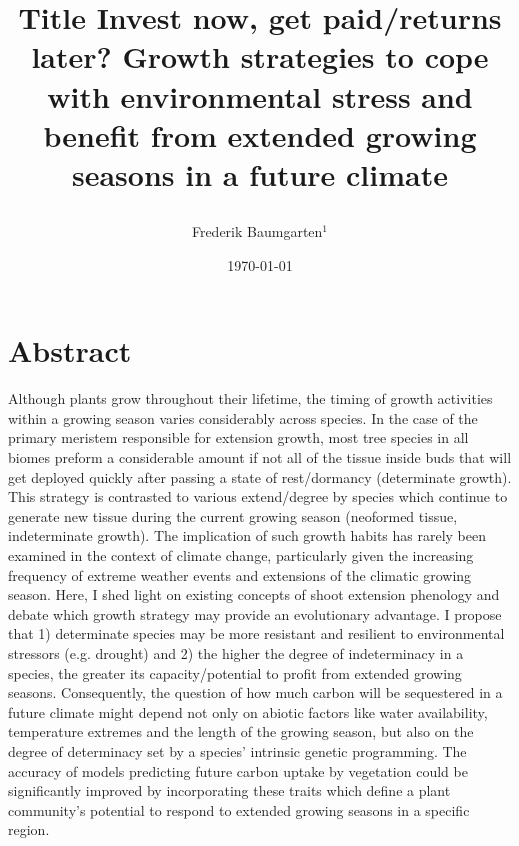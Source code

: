 \documentclass{article}
\begin{document}
\renewcommand{\bibname}{References}%



\title{Title
Invest now, get paid/returns later? Growth strategies to cope with environmental stress and benefit from extended growing seasons in a future climate %


} 


\date{\today}
\author{Frederik Baumgarten$^1$ }
\maketitle 

\section*{Abstract}

Although plants grow throughout their lifetime, the timing of growth activities within a growing season varies considerably across species. In the case of the primary meristem responsible for extension growth, most tree species in all biomes preform a considerable amount if not all of the tissue inside buds that will get deployed quickly after passing a state of rest/dormancy (determinate growth). This strategy is contrasted to various extend/degree by species which continue to generate new tissue during the current growing season (neoformed tissue, indeterminate growth). The implication of such growth habits has rarely been examined in the context of climate change, particularly given the increasing frequency of extreme weather events and extensions of the climatic growing season.  Here, I shed light on existing concepts of shoot extension phenology and debate which growth strategy may provide an evolutionary advantage. I propose that 1) determinate species may be more resistant and resilient to environmental stressors (e.g. drought) and 2) the higher the degree of indeterminacy in a species, the greater its capacity/potential to profit from extended growing seasons. Consequently, the question of how much carbon will be sequestered in a future climate might depend not only on abiotic factors like water availability, temperature extremes and the length of the growing season, but also on the degree of determinacy set by a species' intrinsic genetic programming. The accuracy of models predicting future carbon uptake by vegetation could be significantly improved by incorporating these traits which define a plant community's potential to respond to extended growing seasons in a specific region.
\\
\end{document}

